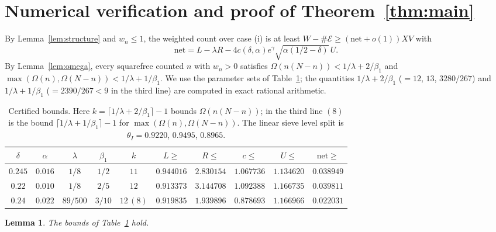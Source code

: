 \documentclass[11pt]{amsart}
\newtheorem{lemma}[theorem]{Lemma}
\theoremstyle{remark}
\newcommand{\cE}{\mathcal{E}}
\begin{document}
\section{Numerical verification and proof of Theorem~\ref{thm:main}}\label{sec:numerics}

By Lemma~\ref{lem:structure} and $w_n\le1$, the weighted count over case (i) is at least
$W-\#\cE\ge(\mathrm{net}+o(1))XV$ with
\[
\mathrm{net}=L-\lambda R-4c(\delta,\alpha)e^{\gamma}\sqrt{\alpha(1/2-\delta)}\,U .
\]
By Lemma~\ref{lem:omega}, every squarefree counted $n$ with $w_n>0$ satisfies
$\Omega(n(N-n))<1/\lambda+2/\beta_1$ and $\max(\Omega(n),\Omega(N-n))<1/\lambda+1/\beta_1$. We use the
parameter sets of Table~\ref{tab:cert}; the quantities $1/\lambda+2/\beta_1$ ($=12$, $13$, $3280/267$) and
$1/\lambda+1/\beta_1$ ($=2390/267<9$ in the third line) are computed in exact rational arithmetic.

\begin{table}[ht]
\centering
\small
\begin{tabular}{cccccccccc}
\hline
$\delta$ & $\alpha$ & $\lambda$ & $\beta_1$ & $k$ & $L\ge$ & $R\le$ & $c\le$ & $U\le$ & $\mathrm{net}\ge$\\
\hline
$0.245$ & $0.016$ & $1/8$ & $1/2$ & $11$ & $0.944016$ & $2.830154$ & $1.067736$ & $1.134620$ & $0.038949$\\
$0.22$ & $0.010$ & $1/8$ & $2/5$ & $12$ & $0.913373$ & $3.144708$ & $1.092388$ & $1.166735$ & $0.039811$\\
$0.24$ & $0.022$ & $89/500$ & $3/10$ & $12\,(8)$ & $0.919835$ & $1.939896$ & $0.878693$ & $1.166966$ & $0.022031$\\
\hline
\end{tabular}
\medskip
\caption{Certified bounds. Here $k=\lceil 1/\lambda+2/\beta_1\rceil-1$ bounds $\Omega(n(N-n))$; in the third line
$(8)$ is the bound $\lceil1/\lambda+1/\beta_1\rceil-1$ for $\max(\Omega(n),\Omega(N-n))$. The linear sieve level
split is $\theta_I=0.9220$, $0.9495$, $0.8965$.}
\label{tab:cert}
\end{table}

\begin{lemma}\label{lem:numerics}
The bounds of Table~\ref{tab:cert} hold.
\end{lemma}
\end{document}
